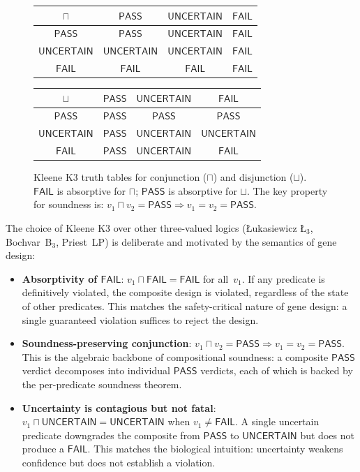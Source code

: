 \documentclass[acmsmall,review,anonymous]{acmart}
\newcommand{\PASS}{\ensuremath{\mathsf{PASS}}\xspace}
\newcommand{\FAIL}{\ensuremath{\mathsf{FAIL}}\xspace}
\newcommand{\UNCERTAIN}{\ensuremath{\mathsf{UNCERTAIN}}\xspace}
\begin{document}
\begin{figure}[t]
\centering
\begin{tabular}{c|ccc}
$\sqcap$ & \PASS & \UNCERTAIN & \FAIL \\ \hline
\PASS     & \PASS     & \UNCERTAIN     & \FAIL \\
\UNCERTAIN & \UNCERTAIN & \UNCERTAIN     & \FAIL \\
\FAIL     & \FAIL     & \FAIL          & \FAIL
\end{tabular}
\hfill
\begin{tabular}{c|ccc}
$\sqcup$ & \PASS & \UNCERTAIN & \FAIL \\ \hline
\PASS     & \PASS     & \PASS          & \PASS \\
\UNCERTAIN & \PASS     & \UNCERTAIN     & \UNCERTAIN \\
\FAIL     & \PASS     & \UNCERTAIN     & \FAIL
\end{tabular}
\caption{Kleene K3 truth tables for conjunction ($\sqcap$) and
         disjunction ($\sqcup$). \FAIL{} is absorptive for $\sqcap$;
         \PASS{} is absorptive for $\sqcup$. The key property for
         soundness is: $v_1 \sqcap v_2 = \PASS \Rightarrow v_1 =
         v_2 = \PASS$.}
\label{fig:truthtables}
\end{figure}

The choice of Kleene K3 over other three-valued logics ({\L}ukasiewicz
\L$_3$, Bochvar~B$_3$, Priest~LP) is deliberate and motivated by the
semantics of gene design:

\begin{itemize}[leftmargin=*,itemsep=0pt,topsep=1pt]
\item \textbf{Absorptivity of \FAIL}:
$v_1 \sqcap \FAIL = \FAIL$ for all~$v_1$.
If any predicate is definitively violated, the composite design is
violated, regardless of the state of other predicates.
This matches the safety-critical nature of gene design: a single
guaranteed violation suffices to reject the design.

\item \textbf{Soundness-preserving conjunction}:
$v_1 \sqcap v_2 = \PASS \Rightarrow v_1 = v_2 = \PASS$.
This is the algebraic backbone of compositional soundness: a composite
\PASS{} verdict decomposes into individual \PASS{} verdicts, each of
which is backed by the per-predicate soundness theorem.

\item \textbf{Uncertainty is contagious but not fatal}:
$v_1 \sqcap \UNCERTAIN = \UNCERTAIN$ when $v_1 \neq \FAIL$.
A single uncertain predicate downgrades the composite from \PASS{} to
\UNCERTAIN{} but does not produce a \FAIL.
This matches the biological intuition: uncertainty weakens confidence
but does not establish a violation.
\end{itemize}
\end{document}

